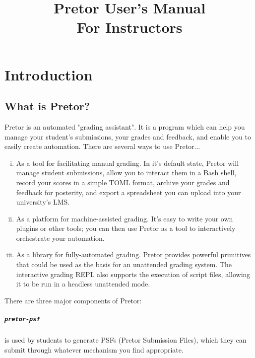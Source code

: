 \documentclass{book}
\title {Pretor User's Manual\\\small{For Instructors}}
\author {}
\date {}
\begin{document}
\maketitle

\tableofcontents

\chapter{Introduction}

\section{What is Pretor?}

Pretor is an automated "grading assistant". It is a program which can help you
manage your student's submissions, your grades and feedback, and enable you to
easily create automation. There are several ways to use Pretor...

\begin{enumerate}[i.]

	\item As a tool for facilitating manual grading. In it's default state,
		Pretor will manage student submissions, allow you to interact
		them in a Bash shell, record your scores in a simple TOML
		format, archive your grades and feedback for posterity, and
		export a spreadsheet you can upload into your university's LMS.

	\item As a platform for machine-assisted grading. It's easy to write
		your own plugins or other tools; you can then use Pretor as a
		tool to interactively orchestrate your automation.

	\item As a library for fully-automated grading. Pretor provides
		powerful primitives that could be used as the basis for an
		unattended grading system. The interactive grading REPL also
		supports the execution of script files, allowing it to be run
		in a headless unattended mode.

\end{enumerate}

There are three major components of Pretor:

\paragraph{\texttt{pretor-psf}} is used by students to generate PSFs (Pretor
Submission Files), which they can submit through whatever mechanism you find
appropriate.
\end{document}
